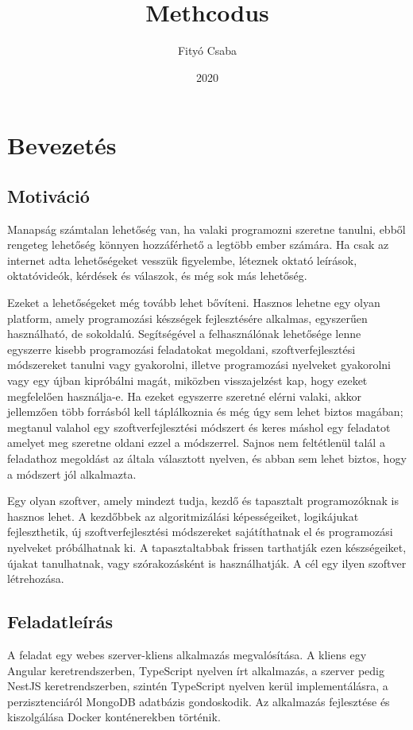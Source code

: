 \documentclass{elteikthesis}
\title{Methcodus}
\date{2020}
\author{Fityó Csaba}
\affiliation{adattudós}
\begin{document}

	\maketitle

	\tableofcontents

	\chapter{Bevezetés}

		\section{Motiváció}
			Manapság számtalan lehetőség van, ha valaki programozni szeretne tanulni, ebből rengeteg lehetőség könnyen hozzáférhető a legtöbb ember számára. Ha csak az internet adta lehetőségeket vesszük figyelembe, léteznek oktató leírások, oktatóvideók, kérdések és válaszok, és még sok más lehetőség.

			Ezeket a lehetőségeket még tovább lehet bővíteni. Hasznos lehetne egy olyan platform, amely programozási készségek fejlesztésére alkalmas, egyszerűen használható, de sokoldalú. Segítségével a felhasználónak lehetősége lenne egyszerre kisebb programozási feladatokat megoldani, szoftverfejlesztési módszereket tanulni vagy gyakorolni, illetve programozási nyelveket gyakorolni vagy egy újban kipróbálni magát, miközben visszajelzést kap, hogy ezeket megfelelően használja-e. Ha ezeket egyszerre szeretné elérni valaki, akkor jellemzően több forrásból kell táplálkoznia és még úgy sem lehet biztos magában; megtanul valahol egy szoftverfejlesztési módszert és keres máshol egy feladatot amelyet meg szeretne oldani ezzel a módszerrel. Sajnos nem feltétlenül talál a feladathoz megoldást az általa választott nyelven, és abban sem lehet biztos, hogy a módszert jól alkalmazta.
			
			Egy olyan szoftver, amely mindezt tudja, kezdő és tapasztalt programozóknak is hasznos lehet. A kezdőbbek az algoritmizálási képességeiket, logikájukat fejleszthetik, új szoftverfejlesztési módszereket sajátíthatnak el és programozási nyelveket próbálhatnak ki. A tapasztaltabbak frissen tarthatják ezen készségeiket, újakat tanulhatnak, vagy szórakozásként is használhatják. A cél egy ilyen szoftver létrehozása.

		\section{Feladatleírás}
			A feladat egy webes szerver-kliens alkalmazás megvalósítása. A kliens egy Angular keretrendszerben, TypeScript nyelven írt alkalmazás, a szerver pedig NestJS keretrendszerben, szintén TypeScript nyelven kerül implementálásra, a perzisztenciáról MongoDB adatbázis gondoskodik. Az alkalmazás fejlesztése és kiszolgálása Docker konténerekben történik.
\end{document}
